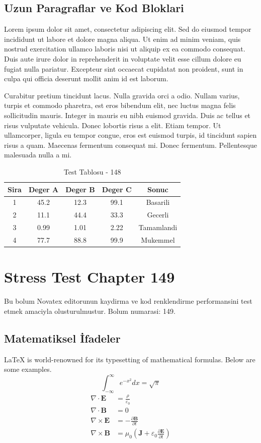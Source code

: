 \documentclass[12pt,a4paper]{article}
\begin{document}
\subsection{Uzun Paragraflar ve Kod Bloklari}
Lorem ipsum dolor sit amet, consectetur adipiscing elit. Sed do eiusmod tempor incididunt ut labore et dolore magna aliqua. Ut enim ad minim veniam, quis nostrud exercitation ullamco laboris nisi ut aliquip ex ea commodo consequat. Duis aute irure dolor in reprehenderit in voluptate velit esse cillum dolore eu fugiat nulla pariatur. Excepteur sint occaecat cupidatat non proident, sunt in culpa qui officia deserunt mollit anim id est laborum.

Curabitur pretium tincidunt lacus. Nulla gravida orci a odio. Nullam varius, turpis et commodo pharetra, est eros bibendum elit, nec luctus magna felis sollicitudin mauris. Integer in mauris eu nibh euismod gravida. Duis ac tellus et risus vulputate vehicula. Donec lobortis risus a elit. Etiam tempor. Ut ullamcorper, ligula eu tempor congue, eros est euismod turpis, id tincidunt sapien risus a quam. Maecenas fermentum consequat mi. Donec fermentum. Pellentesque malesuada nulla a mi.

\begin{table}[h!]
\centering
\begin{tabular}{|c|c|c|c|c|}
\hline
\textbf{Sira} & \textbf{Deger A} & \textbf{Deger B} & \textbf{Deger C} & \textbf{Sonuc} \\
\hline
1 & 45.2 & 12.3 & 99.1 & Basarili \\
2 & 11.1 & 44.4 & 33.3 & Gecerli \\
3 & 0.99 & 1.01 & 2.22 & Tamamlandi \\
4 & 77.7 & 88.8 & 99.9 & Mukemmel \\
\hline
\end{tabular}
\caption{Test Tablosu - 148}
\end{table}

\newpage
\section{Stress Test Chapter 149}
Bu bolum Novatex editorunun kaydirma ve kod renklendirme performansini test etmek amaciyla olusturulmustur. Bolum numarasi: 149.

\subsection{Matematiksel İfadeler}
\LaTeX{} is world-renowned for its typesetting of mathematical formulas. Below are some examples.
\begin{equation}
\int_{-\infty}^{\infty} e^{-x^2} dx = \sqrt{\pi}
\end{equation}
\begin{align}
\nabla \cdot \mathbf{E} &= \frac{\rho}{\varepsilon_0} \\
\nabla \cdot \mathbf{B} &= 0 \\
\nabla \times \mathbf{E} &= -\frac{\partial \mathbf{B}}{\partial t} \\
\nabla \times \mathbf{B} &= \mu_0\left(\mathbf{J} + \varepsilon_0 \frac{\partial \mathbf{E}}{\partial t}\right)
\end{align}
\end{document}
